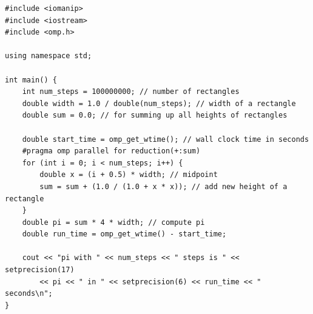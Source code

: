 \documentclass[../../main.tex]{subfiles}
\begin{document}
    \smallbreak
    \smallbreak
    \begin{samepage}
    \begin{lstlisting}
#include <iomanip>
#include <iostream>
#include <omp.h>

using namespace std;

int main() {
    int num_steps = 100000000; // number of rectangles
    double width = 1.0 / double(num_steps); // width of a rectangle
    double sum = 0.0; // for summing up all heights of rectangles

    double start_time = omp_get_wtime(); // wall clock time in seconds
    #pragma omp parallel for reduction(+:sum)
    for (int i = 0; i < num_steps; i++) {
        double x = (i + 0.5) * width; // midpoint
        sum = sum + (1.0 / (1.0 + x * x)); // add new height of a rectangle
    }
    double pi = sum * 4 * width; // compute pi
    double run_time = omp_get_wtime() - start_time;

    cout << "pi with " << num_steps << " steps is " << setprecision(17)
        << pi << " in " << setprecision(6) << run_time << " seconds\n";
}
    \end{lstlisting}
    \end{samepage}
\end{document}

